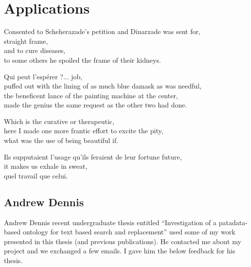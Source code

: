 
\chapter{Applications}
\label{ch:applications}

\startcontents[chapters]

\vfill

Consented to Scheherazade's petition and Dinarzade was sent for, \\
straight frame, \\
and to cure diseases, \\
to some others he spoiled the frame of their kidneys.

Qui peut l'espérer ?... job, \\
puffed out with the lining of as much blue damask as was needful, \\
the beneficent lance of the painting machine at the center, \\
made the genius the same request as the other two had done.

Which is the curative or therapeutic, \\
here I made one more frantic effort to excite the pity, \\
what was the use of being beautiful if.

Ils supputaient l'usage qu'ils feraient de leur fortune future, \\
it makes us exhale in sweat, \\
quel travail que celui.

\newpage
\minicontents
\spirals



\section{Andrew Dennis}


Andrew Dennis recent undergraduate thesis entitled ``Investigation of a patadata-based ontology for text based search and replacement'' \citeyear{Dennis2016} used some of my work presented in this thesis (and previous publications). He contacted me about my project and we exchanged a few emails. I gave him the below feedback for his thesis.

